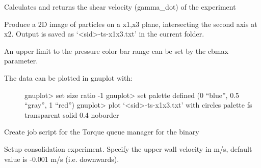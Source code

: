 \documentclass[letterpaper,10pt,english]{sphinxmanual}
\begin{document}
\begin{fulllineitems}

\begin{fulllineitems}
\label{python_api:sphere.Spherebin.shearvel}
Calculates and returns the shear velocity (gamma\_dot) of the experiment

\end{fulllineitems}


\begin{fulllineitems}
\label{python_api:sphere.Spherebin.thinsection_x1x3}
Produce a 2D image of particles on a x1,x3 plane, intersecting the second axis at x2.
Output is saved as `\textless{}sid\textgreater{}-ts-x1x3.txt' in the current folder.

An upper limit to the pressure color bar range can be set by the cbmax parameter.
\begin{description}
\item[{The data can be plotted in gnuplot with:}] \leavevmode
gnuplot\textgreater{} set size ratio -1
gnuplot\textgreater{} set palette defined (0 ``blue'', 0.5 ``gray'', 1 ``red'')
gnuplot\textgreater{} plot `\textless{}sid\textgreater{}-ts-x1x3.txt' with circles palette fs transparent solid 0.4 noborder

\end{description}

\end{fulllineitems}


\begin{fulllineitems}
\label{python_api:sphere.Spherebin.torqueScript}
Create job script for the Torque queue manager for the binary

\end{fulllineitems}


\begin{fulllineitems}
\label{python_api:sphere.Spherebin.uniaxialStrainRate}
Setup consolidation experiment. Specify the upper wall 
velocity in m/s, default value is -0.001 m/s (i.e. downwards).


\end{fulllineitems}
\end{fulllineitems}
\end{document}
